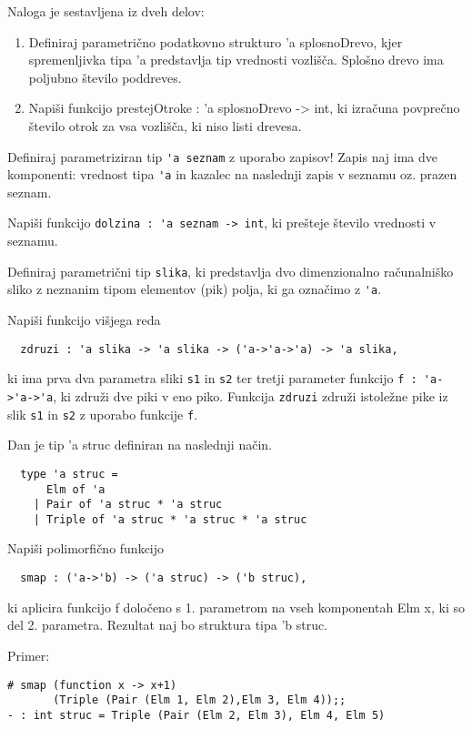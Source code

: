 \begin{ex}
Naloga je sestavljena iz dveh delov:
\begin{enumerate}
    \item Definiraj parametri\v cno podatkovno strukturo 'a splosnoDrevo, kjer spremenljivka tipa 'a predstavlja tip vrednosti vozli\v s\v ca. Splo\v sno drevo ima poljubno \v stevilo poddreves. 
    
    \item Napi\v si funkcijo prestejOtroke : 'a splosnoDrevo -> int, ki izra\v cuna povpre\v cno \v stevilo otrok za vsa vozli\v s\v ca, ki niso listi drevesa.
\end{enumerate}

\end{ex}
\begin{ex}
  Definiraj parametriziran tip \lstinline{'a seznam} z uporabo zapisov!
  Zapis naj ima dve komponenti: vrednost tipa \lstinline{'a} in kazalec na
  naslednji zapis v seznamu oz. prazen seznam.

  Napi\v si funkcijo \lstinline{dolzina : 'a seznam -> int}, ki
  pre\v steje \v stevilo vrednosti v seznamu.


\end{ex} 
\begin{ex}
  Definiraj parametri\v cni tip \lstinline{slika}, ki predstavlja
  dvo dimenzionalno ra\v cunalni\v sko sliko z neznanim tipom
  elementov (pik) polja, ki ga ozna\v cimo z \lstinline{'a}.

  Napi\v si funkcijo vi\v sjega reda

  \begin{lstlisting}
  zdruzi : 'a slika -> 'a slika -> ('a->'a->'a) -> 'a slika,
  \end{lstlisting}
  ki ima prva dva parametra sliki \lstinline{s1} in \lstinline{s2} ter
  tretji parameter funkcijo \lstinline{f : 'a->'a->'a}, ki zdru\v zi dve
  piki v eno piko. Funkcija \lstinline{zdruzi} zdru\v zi istole\v zne
  pike iz slik \lstinline{s1} in \lstinline{s2} z uporabo funkcije
  \lstinline{f}.


\end{ex} 
\begin{ex}
  Dan je tip 'a struc definiran na naslednji na\v cin.
\begin{lstlisting}
  type 'a struc = 
      Elm of 'a 
    | Pair of 'a struc * 'a struc 
    | Triple of 'a struc * 'a struc * 'a struc
\end{lstlisting}
  Napi\v si polimorfi\v cno funkcijo
\begin{lstlisting}
  smap : ('a->'b) -> ('a struc) -> ('b struc),
\end{lstlisting}
  ki aplicira funkcijo f dolo\v ceno s 1. parametrom na vseh
  komponentah Elm x, ki so del 2. parametra. Rezultat naj bo struktura
  tipa 'b struc.

\noindent\/Primer:            
\begin{lstlisting}
# smap (function x -> x+1) 
       (Triple (Pair (Elm 1, Elm 2),Elm 3, Elm 4));; 
- : int struc = Triple (Pair (Elm 2, Elm 3), Elm 4, Elm 5) 
\end{lstlisting}

\end{ex} 
